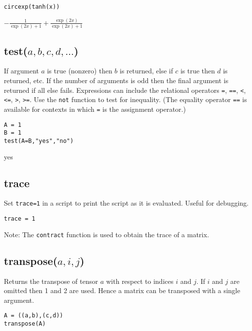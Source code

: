 {\color{blue}
\begin{verbatim}
circexp(tanh(x))
\end{verbatim}
}

\noindent
$\displaystyle -\frac{1}{\exp(2x)+1}+\frac{\exp(2x)}{\exp(2x)+1}$

\subsection*{test($a,b,c,d,\ldots$)}

If argument $a$ is true (nonzero) then $b$ is returned, else if $c$ is true then $d$ is returned, etc.
If the number of arguments is odd then the final argument is returned if all else fails.
Expressions can include the relational operators
\verb$=$,
\verb$==$,
\verb$<$,
\verb$<=$,
\verb$>$,
\verb$>=$.
Use the
\verb$not$
function to test for inequality.
(The equality operator
\verb$==$
is available for contexts in which
\verb$=$
is the assignment operator.)

{\color{blue}
\begin{verbatim}
A = 1
B = 1
test(A=B,"yes","no")
\end{verbatim}
}

\noindent
yes

\subsection*{trace}

Set {\tt trace=1} in a script to print the script as it is evaluated.
Useful for debugging.

{\color{blue}
\begin{verbatim}
trace = 1
\end{verbatim}
}

\noindent
Note:
The
\verb$contract$
function is used to obtain the trace of a matrix.

\subsection*{transpose($a,i,j$)}

Returns the transpose of tensor $a$ with respect to indices $i$ and $j$.
If $i$ and $j$ are omitted then 1 and 2 are used.
Hence a matrix can be transposed with a single argument.

{\color{blue}
\begin{verbatim}
A = ((a,b),(c,d))
transpose(A)
\end{verbatim}
}

